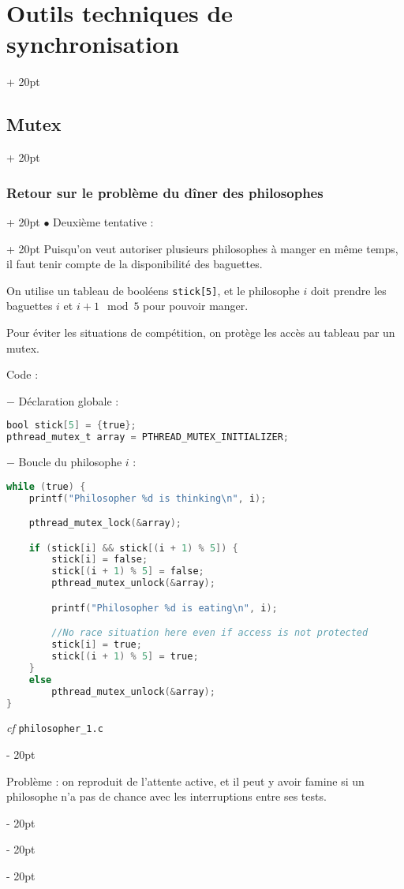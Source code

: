 \documentclass[a4paper, 12pt, twoside]{article}
\newcommand{\ind}[1][20pt]{\advance\leftskip + #1}
\newcommand{\deind}[1][20pt]{\advance\leftskip - #1}
\newenvironment{indt}[2][20pt]{#2 \par \ind[#1]}{\par \deind} %
\begin{document}
\begin{indt}{\section{Outils techniques de synchronisation}}
\begin{indt}{\subsection{Mutex}}
\begin{indt}{\subsubsection{Retour sur le problème du dîner des philosophes}}
                \begin{indt}{$\bullet$ Deuxième tentative :}
                    Puisqu'on veut autoriser plusieurs philosophes à manger en même temps, il faut tenir compte de la disponibilité des baguettes.

                    On utilise un tableau de booléens \texttt{stick[5]}, et le philosophe $i$ doit prendre les baguettes $i$ et $i + 1 \mod 5$ pour pouvoir manger.

                    Pour éviter les situations de compétition, on protège les accès au tableau par un mutex.

                    Code :

                    $-$ Déclaration globale :

                    \begin{lstlisting}[language=C, xleftmargin=100pt]
bool stick[5] = {true};
pthread_mutex_t array = PTHREAD_MUTEX_INITIALIZER;\end{lstlisting}

                    $-$ Boucle du philosophe $i$ :

                    \begin{lstlisting}[language=C, xleftmargin=100pt]
while (true) {
    printf("Philosopher %d is thinking\n", i);

    pthread_mutex_lock(&array);

    if (stick[i] && stick[(i + 1) % 5]) {
        stick[i] = false;
        stick[(i + 1) % 5] = false;
        pthread_mutex_unlock(&array);

        printf("Philosopher %d is eating\n", i);

        //No race situation here even if access is not protected
        stick[i] = true; 
        stick[(i + 1) % 5] = true;
    }
    else
        pthread_mutex_unlock(&array);
}\end{lstlisting}

                    \textit{cf} \texttt{philosopher\_1.c}
                \end{indt}

                \vspace{12pt}
                
                Problème : on reproduit de l'attente active, et il peut y avoir famine si un philosophe n'a pas de chance avec les interruptions entre ses tests.

                \vspace{12pt}
                

\end{indt}
\end{indt}
\end{indt}
\end{document}
